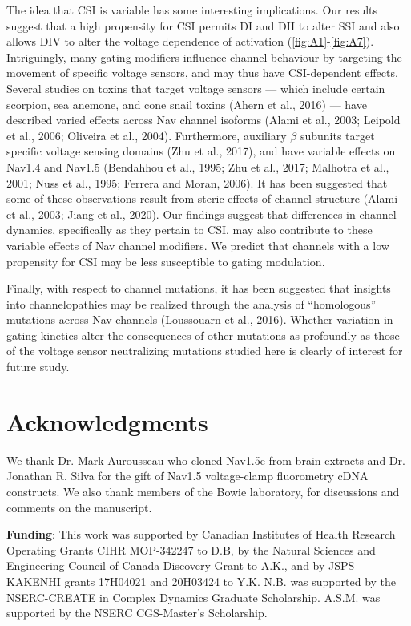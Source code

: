 The idea that CSI is variable has some interesting implications. Our results suggest that a high propensity for CSI permits DI and DII to alter SSI and also allows DIV to alter the voltage dependence of activation (\autoref{fig:A1}-\ref{fig:A7}). Intriguingly, many gating modifiers influence channel behaviour by targeting the movement of specific voltage sensors, and may thus have CSI-dependent effects. Several studies on toxins that target voltage sensors --- which include certain scorpion, sea anemone, and cone snail toxins (Ahern et al., 2016) --- have described varied effects across Nav channel isoforms (Alami et al., 2003; Leipold et al., 2006; Oliveira et al., 2004). Furthermore, auxiliary $\beta$ subunits target specific voltage sensing domains (Zhu et al., 2017), and have variable effects on Nav1.4 and Nav1.5 (Bendahhou et al., 1995; Zhu et al., 2017; Malhotra et al., 2001; Nuss et al., 1995; Ferrera and Moran, 2006). It has been suggested that some of these observations result from steric effects of channel structure (Alami et al., 2003; Jiang et al., 2020). Our findings suggest that differences in channel dynamics, specifically as they pertain to CSI, may also contribute to these variable effects of Nav channel modifiers. We predict that channels with a low propensity for CSI may be less susceptible to gating modulation. 

Finally, with respect to channel mutations, it has been suggested that insights into channelopathies may be realized through the analysis of “homologous” mutations across Nav channels (Loussouarn et al., 2016). Whether variation in gating kinetics alter the consequences of other mutations as profoundly as those of the voltage sensor neutralizing mutations studied here is clearly of interest for future study.

\section{Acknowledgments}

We thank Dr. Mark Aurousseau who cloned Nav1.5e from brain extracts and Dr. Jonathan R. Silva for the gift of Nav1.5 voltage-clamp fluorometry cDNA constructs. We also thank members of the Bowie laboratory, for discussions and comments on the manuscript.

\noindent \textbf{Funding}: This work was supported by Canadian Institutes of Health Research Operating Grants CIHR MOP-342247 to D.B, by the Natural Sciences and Engineering Council of Canada Discovery Grant to A.K., and by JSPS KAKENHI grants 17H04021 and 20H03424 to Y.K. N.B. was supported by the NSERC-CREATE in Complex Dynamics Graduate Scholarship. A.S.M. was supported by the NSERC CGS-Master’s Scholarship. 

